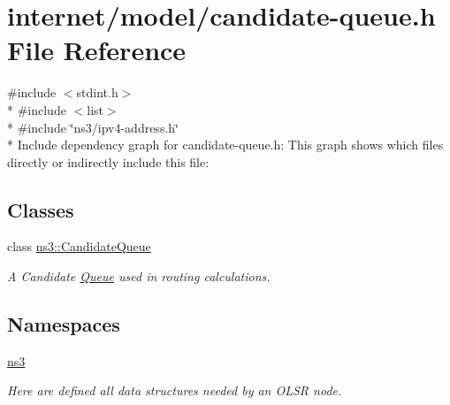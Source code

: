 \hypertarget{candidate-queue_8h}{}\section{internet/model/candidate-\/queue.h File Reference}
\label{candidate-queue_8h}
{\ttfamily \#include $<$stdint.\+h$>$}\\*
{\ttfamily \#include $<$list$>$}\\*
{\ttfamily \#include \char`\"{}ns3/ipv4-\/address.\+h\char`\"{}}\\*
Include dependency graph for candidate-\/queue.h\+:
This graph shows which files directly or indirectly include this file\+:
\subsection*{Classes}
\begin{DoxyCompactItemize}
\item 
class \hyperlink{classns3_1_1CandidateQueue}{ns3\+::\+Candidate\+Queue}
\begin{DoxyCompactList}\small\item\em A Candidate \hyperlink{classns3_1_1Queue}{Queue} used in routing calculations. \end{DoxyCompactList}\end{DoxyCompactItemize}
\subsection*{Namespaces}
\begin{DoxyCompactItemize}
\item 
 \hyperlink{namespacens3}{ns3}
\begin{DoxyCompactList}\small\item\em Here are defined all data structures needed by an O\+L\+SR node. \end{DoxyCompactList}\end{DoxyCompactItemize}

